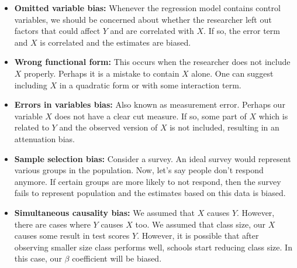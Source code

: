 \documentclass[12pt]{article}
\theoremstyle{definition}
\theoremstyle{property}
\theoremstyle{assumption}
\theoremstyle{example}
\theoremstyle{comment}
\begin{document}
\begin{itemize}
\item \textbf{Omitted variable bias: }Whenever the regression model contains control variables, we should be concerned about whether the researcher left out factors that could affect $Y$ and are correlated with $X$. If so, the error term and $X$ is correlated and the estimates are biased. 
\item \textbf{Wrong functional form: }This occurs when the researcher does not include $X$ properly. Perhaps it is a mistake to contain $X$ alone. One can suggest including $X$ in a quadratic form or with some interaction term.  
\item \textbf{Errors in variables bias: }Also known as measurement error. Perhaps our variable $X$ does not have a clear cut measure. If so, some part of $X$ which is related to $Y$ and the observed version of $X$ is not included, resulting in an attenuation bias.
\item \textbf{Sample selection bias: }Consider a survey. An ideal survey would represent various groups in the population. Now, let's say people don't respond anymore. If certain groups are more likely to not respond, then the survey fails to represent population and the estimates based on this data is biased.
\item \textbf{Simultaneous causality bias: }We assumed that $X$ causes $Y$. However, there are cases where $Y$ causes $X$ too.  We assumed that class size,  our $X$ causes some result in test scores $Y$. However, it is possible that after observing smaller size class performs well, schools start reducing class size. In this case, our $\beta$ coefficient will be biased. 
\end{itemize}
\end{document}
